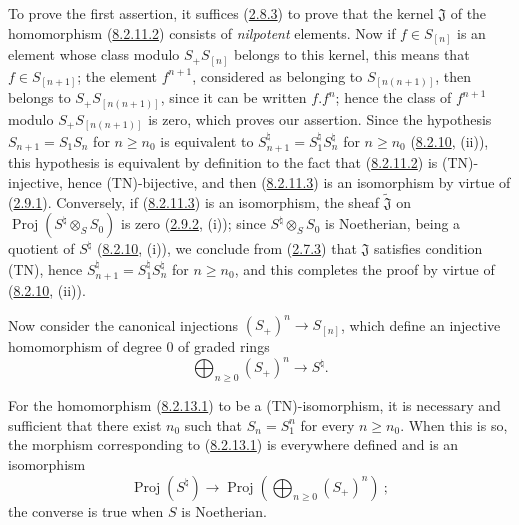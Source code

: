 To prove the first assertion, it suffices
(\hyperref[II.2.8.3]{2.8.3}) to prove that the kernel $\mathfrak{J}$ of
the homomorphism (\hyperref[II.8.2.11.2]{8.2.11.2}) consists of
\emph{nilpotent} elements. Now if $f\in S_{[n]}$ is an element whose class modulo
$S_+S_{[n]}$ belongs to this kernel, this means that $f\in S_{[n+1]}$;
the element $f^{n+1}$, considered as belonging to $S_{[n(n+1)]}$, then
belongs to $S_+S_{[n(n+1)]}$, since it can be written $f.f^n$; hence the class of
$f^{n+1}$ modulo $S_+S_{[n(n+1)]}$ is zero, which proves our assertion.
Since the hypothesis $S_{n+1}=S_1S_n$ for $n\geq n_0$ is equivalent to
$S_{n+1}^{\natural}=S_1^{\natural}S_n^{\natural}$ for $n\geq n_0$
(\hyperref[II.8.2.10]{8.2.10}, (ii)), this hypothesis is equivalent by definition
to the fact that (\hyperref[II.8.2.11.2]{8.2.11.2}) is (TN)-injective, hence
(TN)-bijective, and then (\hyperref[II.8.2.11.3]{8.2.11.3}) is an
isomorphism by virtue of (\hyperref[II.2.9.1]{2.9.1}). Conversely, if
(\hyperref[II.8.2.11.3]{8.2.11.3}) is an isomorphism, the sheaf
$\widetilde{\mathfrak{J}}$ on
$\operatorname{Proj}(S^{\natural}\otimes_S S_0)$ is zero
(\hyperref[II.2.9.2]{2.9.2}, (i)); since
$S^{\natural}\otimes_S S_0$ is Noetherian, being a quotient of $S^{\natural}$
(\hyperref[II.8.2.10]{8.2.10}, (i)), we conclude from
(\hyperref[II.2.7.3]{2.7.3}) that $\mathfrak{J}$ satisfies condition (TN),
hence $S_{n+1}^{\natural}=S_1^{\natural}S_n^{\natural}$ for $n\geq n_0$, and
this completes the proof by virtue of
(\hyperref[II.8.2.10]{8.2.10}, (ii)).

\begin{env}[8.2.13]
\label{II.8.2.13}
Now consider the canonical injections $(S_+)^n\to S_{[n]}$, which
define an injective homomorphism of degree $0$ of graded rings
\begin{equation}
\label{II.8.2.13.1}
  \bigoplus_{n\geq0}(S_+)^n\to S^{\natural}.
\tag{8.2.13.1}
\end{equation}
\end{env}

\begin{proposition}[8.2.14]
\label{II.8.2.14}
For the homomorphism \textup{(\hyperref[II.8.2.13.1]{8.2.13.1})} to be a
\textup{(TN)}-isomorphism, it is necessary and sufficient that there exist $n_0$ such that
$S_n=S_1^n$ for every $n\geq n_0$. When this is so, the morphism
corresponding to \textup{(\hyperref[II.8.2.13.1]{8.2.13.1})} is everywhere defined and
is an isomorphism
\[
  \operatorname{Proj}(S^{\natural})\to
  \operatorname{Proj}\left(\bigoplus_{n\geq0}(S_+)^n\right)~;
\]
the converse is true when $S$ is Noetherian.
\end{proposition}

